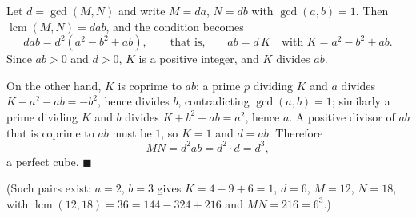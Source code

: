 Let $d=\gcd(M,N)$ and write $M=da$, $N=db$ with $\gcd(a,b)=1$. Then $\operatorname{lcm}(M,N)=dab$, and the condition becomes
\[dab=d^2\left(a^2-b^2+ab\right),\qquad\text{that is,}\qquad ab=d\,K\quad\text{with }K=a^2-b^2+ab.\]
Since $ab>0$ and $d>0$, $K$ is a positive integer, and $K$ divides $ab$.

On the other hand, $K$ is coprime to $ab$: a prime $p$ dividing $K$ and $a$ divides $K-a^2-ab=-b^2$, hence divides $b$, contradicting $\gcd(a,b)=1$; similarly a prime dividing $K$ and $b$ divides $K+b^2-ab=a^2$, hence $a$. A positive divisor of $ab$ that is coprime to $ab$ must be $1$, so $K=1$ and $d=ab$. Therefore
\[MN=d^2ab=d^2\cdot d=d^3,\]
a perfect cube. $\blacksquare$

(Such pairs exist: $a=2$, $b=3$ gives $K=4-9+6=1$, $d=6$, $M=12$, $N=18$, with $\operatorname{lcm}(12,18)=36=144-324+216$ and $MN=216=6^3$.)
